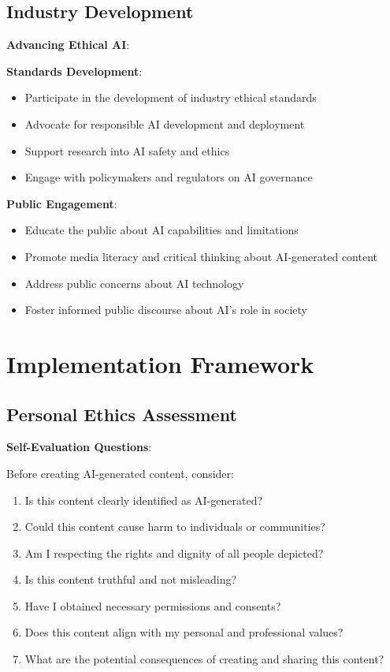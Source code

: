 \subsection{Industry Development}
\textbf{Advancing Ethical AI}:

\textbf{Standards Development}:
\begin{itemize}
\item Participate in the development of industry ethical standards
\item Advocate for responsible AI development and deployment
\item Support research into AI safety and ethics
\item Engage with policymakers and regulators on AI governance
\end{itemize}

\textbf{Public Engagement}:
\begin{itemize}
\item Educate the public about AI capabilities and limitations
\item Promote media literacy and critical thinking about AI-generated content
\item Address public concerns about AI technology
\item Foster informed public discourse about AI's role in society
\end{itemize}

\section{Implementation Framework}

\subsection{Personal Ethics Assessment}
\textbf{Self-Evaluation Questions}:

Before creating AI-generated content, consider:
\begin{enumerate}
\item Is this content clearly identified as AI-generated?
\item Could this content cause harm to individuals or communities?
\item Am I respecting the rights and dignity of all people depicted?
\item Is this content truthful and not misleading?
\item Have I obtained necessary permissions and consents?
\item Does this content align with my personal and professional values?
\item What are the potential consequences of creating and sharing this content?
\end{enumerate}

